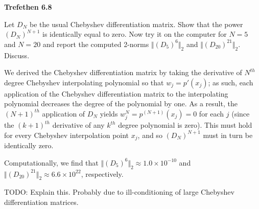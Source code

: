 \textbf{Trefethen 6.8}

Let $D_N$ be the usual Chebyshev differentiation matrix. Show that the power $(D_N)^{N+1}$ is identically equal to zero.
Now try it on the computer for $N = 5$ and $N = 20$ and report the computed 2-norms $\Vert (D_5)^{6} \Vert_2$ and 
$\Vert (D_{20})^{21} \Vert_2$. Discuss.

\begin{solution}
  We derived the Chebyshev differentiation matrix by taking the derivative of $N^{th}$ degree Chebyshev interpolating 
  polynomial so that $w_j = p'(x_j)$; as such, each application of the Chebyshev differentiation matrix to
  the interpolating polynomial decreases the degree of the polynomial by one. As a result, the ${(N+1)}^{th}$ 
  application of $D_N$ yields $w_j^{N} = p^{(N+1)}(x_j) = 0$ for each $j$ (since the ${(k + 1)^{th}}$ derivative of any
  $k^{th}$ degree polynomial is zero). This must hold for every Chebyshev interpolation point $x_j$, and so 
  $(D_N)^{N+1}$ must in turn be identically zero.

  Computationally, we find that $\Vert (D_5)^{6} \Vert_2 \approx 1.0 \times 10^{-10}$ and 
  $\Vert (D_{20})^{21} \Vert_2 \approx 6.6 \times 10^{22}$, respectively.

  TODO: Explain this. Probably due to ill-conditioning of large Chebyshev differentiation matrices.
  \ \\
\end{solution}